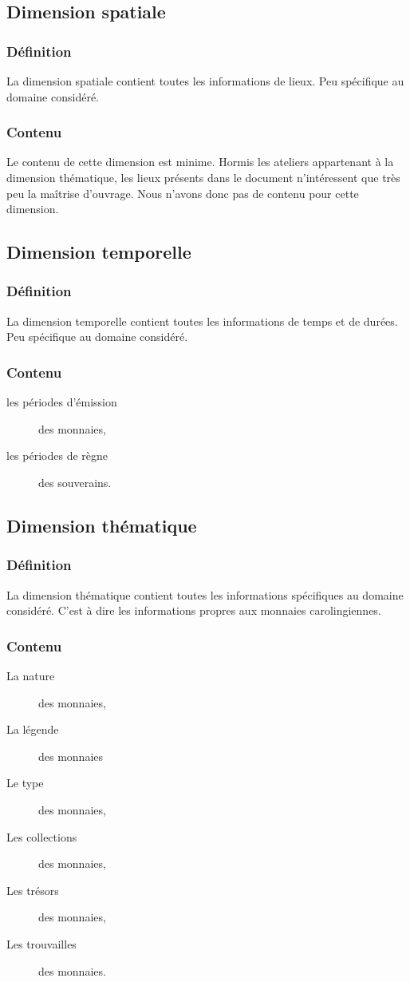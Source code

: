 \documentclass[a4paper, 11pt]{report}
\begin{document}
    \subsection{Dimension spatiale}
    \subsubsection{Définition}
     La dimension spatiale contient toutes les informations de lieux. Peu spécifique au domaine considéré.
    \subsubsection{Contenu}
       Le contenu de cette dimension est minime. Hormis les ateliers appartenant à la dimension thématique, les lieux présents dans le document n'intéressent que très peu la maîtrise d'ouvrage. Nous n'avons donc pas de contenu pour cette dimension.
	\subsection{Dimension temporelle}
	    \subsubsection{Définition}
    La dimension temporelle contient toutes les informations de temps et de durées. Peu spécifique au domaine considéré.\\
    \subsubsection{Contenu}
    \begin{description}
    \item[les périodes d'émission] des monnaies,
    \item[les périodes de règne] des souverains.
    \end{description}
    
	\subsection{Dimension thématique}
	    \subsubsection{Définition}
    La dimension thématique contient toutes les informations spécifiques au domaine considéré.  C'est à dire les informations propres aux monnaies carolingiennes.
    \subsubsection{Contenu}	
    \begin{description}
    \item[La nature] des monnaies,
    \item[La légende] des monnaies
    \item[Le type] des monnaies,
    \item[Les collections] des monnaies,
    \item[Les trésors] des monnaies,
    \item[Les trouvailles] des monnaies.
    \end{description}
    
\end{document}
